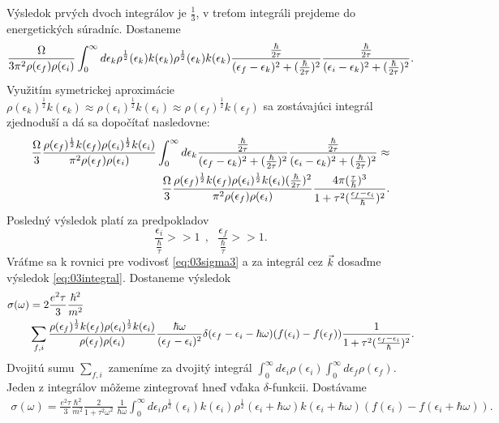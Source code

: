 Výsledok prvých dvoch integrálov je $\frac{1}{3}$, v treťom integráli prejdeme do energetických súradníc. Dostaneme
\begin{align}
\frac{\Omega}{3\pi^2\rho(\epsilon_f)\rho(\epsilon_i)}\int_0^\infty d\epsilon_k \rho^{\frac{1}{2}}(\epsilon_k)k(\epsilon_k)\rho^{\frac{1}{2}}(\epsilon_k)k(\epsilon_k)\frac{\frac{\hbar}{2\tau}}{(\epsilon_f-\epsilon_{k})^2+(\frac{\hbar}{2\tau})^2}\frac{\frac{\hbar}{2\tau}}{(\epsilon_i-\epsilon_{k})^2+(\frac{\hbar}{2\tau})^2}\text{.}
\end{align}
Využitím symetrickej aproximácie $\rho(\epsilon_k)^{\frac{1}{2}}k(\epsilon_k)\approx\rho(\epsilon_i)^{\frac{1}{2}}k(\epsilon_i)\approx\rho(\epsilon_f)^{\frac{1}{2}}k(\epsilon_f)$ sa zostávajúci integrál zjednoduší
a dá sa dopočítať nasledovne:
\begin{align}
\label{eq:03integral}
\frac{\Omega}{3}\frac{\rho(\epsilon_f)^{\frac{1}{2}}k(\epsilon_f)\rho(\epsilon_i)^{\frac{1}{2}}k(\epsilon_i)}{\pi^{2}\rho(\epsilon_f)\rho(\epsilon_i)}\int_0^\infty d\epsilon_k\frac{\frac{\hbar}{2\tau}}{(\epsilon_f-\epsilon_{k})^2+(\frac{\hbar}{2\tau})^2}\frac{\frac{\hbar}{2\tau}}{(\epsilon_i-\epsilon_{k})^2+(\frac{\hbar}{2\tau})^2}\approx\\ \notag
\frac{\Omega}{3}\frac{\rho(\epsilon_f)^{\frac{1}{2}}k(\epsilon_f)\rho(\epsilon_i)^{\frac{1}{2}}k(\epsilon_i)(\frac{\hbar}{2\tau})^2}{\pi^{2}\rho(\epsilon_f)\rho(\epsilon_i)}\frac{4\pi(\frac{\tau}{\hbar})^3}{1+\tau^2(\frac{\epsilon_f-\epsilon_i}{\hbar})^2}\text{.}
\end{align}
Posledný výsledok platí za  predpokladov
\begin{equation}
\frac{\epsilon_i}{\frac{\hbar}{\tau}} >> 1 \  \  , \ \ \   \frac{\epsilon_f}{\frac{\hbar}{\tau}} >> 1  \text{.}
\end{equation}
Vráťme sa k rovnici pre vodivosť \eqref{eq:03sigma3}
a za integrál cez $\vec{k}$ dosaďme výsledok \eqref{eq:03integral}. Dostaneme výsledok
\begin{align}
\notag
\sigma(\omega)&=
2\frac{e^{2}\tau}{3}\frac{\hbar^{2}}{m^{2}}
\\
&\sum_{f,i}\frac{\rho(\epsilon_f)^{\frac{1}{2}}k(\epsilon_f)\rho(\epsilon_i)^{\frac{1}{2}}k(\epsilon_i)}{\rho(\epsilon_f)\rho(\epsilon_i)}
\frac{\hbar\omega}{(\epsilon_f-\epsilon_i)^{2}}\delta(\epsilon_f-\epsilon_i-\hbar\omega)(f(\epsilon_i)-f(\epsilon_f)) \frac{1}{1+\tau^2(\frac{\epsilon_f-\epsilon_i}{\hbar})^2}
\text{.}
\end{align}
Dvojitú sumu  $\sum_{f,i}$ zameníme za dvojitý integrál $\int_0^\infty d\epsilon_i\rho(\epsilon_i) \int_0^\infty d\epsilon_f\rho(\epsilon_f)$. Jeden z integrálov môžeme zintegrovať hneď vďaka
$\delta$-funkcii. Dostávame
\begin{align}
\sigma(\omega)=
\frac{e^{2}\tau}{3}\frac{\hbar^{2}}{m^{2}}
\frac{2}{1+\tau^2\omega^2}\
\frac{1}{\hbar\omega}
\int_0^\infty d\epsilon_i\rho^{\frac{1}{2}}(\epsilon_i)k(\epsilon_i)\rho^{\frac{1}{2}}(\epsilon_i+\hbar\omega)k(\epsilon_i+\hbar\omega)(f(\epsilon_i)-f(\epsilon_i+\hbar\omega))\text{.}
\end{align}
